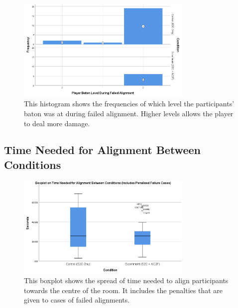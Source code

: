 \begin{figure}[tbph]
    \centering
    \includegraphics[width=0.75\textwidth]{figures/graphs/failureBatonLevelHistogram.png}
    \caption[Histogram on Player Baton Level During Failed Alignments]{This histogram shows the frequencies of which level the participants' baton was at during failed alignment. Higher levels allows the player to deal more damage.}
    \label{fig:ex2failedAlignmentBatonLevel}
\end{figure}

\subsection{Time Needed for Alignment Between Conditions}
\begin{figure}[tbph]
    \centering
    \includegraphics[width=0.75\textwidth]{figures/graphs/boxplotAlignmentTimesWithPenalties.png}
    \caption[Boxplot on Time Needed To Align Participants To Centre (Including Failure Penalties)]{This boxplot shows the spread of time needed to align participants towards the centre of the room. It includes the penalties that are given to cases of failed alignments.}
    \label{fig:alignmentTimesWithPenalties}
\end{figure}


